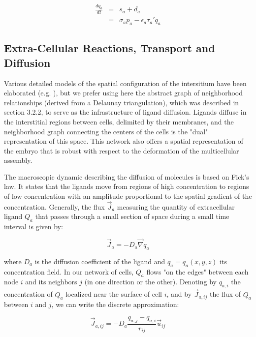 $$\begin{eqnarray}        \frac{dq_a}{dt} & = & s_a + d_a \\                        & = & \sigma_a p_a - \epsilon_a \tau_a' q_a      \end{eqnarray}$$


\subsection{Extra-Cellular Reactions, Transport and Diffusion}


Various detailed models of the spatial configuration of the intersitium have been elaborated (e.g. \cite{Kojic:2010jo}), but we prefer using here the abstract graph of neighborhood relationships (derived from a Delaunay triangulation), which was described in section 3.2.2, to serve as the infrastructure of ligand diffusion. Ligands diffuse in the interstitial regions between cells, delimited by their membranes, and the neighborhood graph connecting the centers of the cells is the "dual" representation of this space. This network also offers a spatial representation of the embryo that is robust with respect to the deformation of the multicellular assembly.

The macroscopic dynamic describing the diffusion of molecules is based on Fick's law. It states that the ligands move from regions of high concentration to regions of low concentration with an amplitude proportional to the spatial gradient of the concentration. Generally, the flux $\vec{J}_a$ measuring the quantity of extracellular ligand $Q_a$ that passes through a small section of space during a small time interval is given by:

$$\vec{J}_a = -D_a \vec{\nabla}q_a $$

where $D_a$ is the diffusion coefficient of the ligand and $q_a = q_a(x,y,z)$ its concentration field. In our network of cells, $Q_a$ flows "on the edges" between each node $i$ and its neighbors $j$ (in one direction or the other). Denoting by $q_{a,i}$ the concentration of $Q_a$ localized near the surface of cell $i$, and by $\vec{J}_{a,ij}$ the flux of $Q_a$ between $i$ and $j$, we can write the discrete approximation:

$$\vec{J}_{a,ij} = -D_a \frac{q_{a,j} - q_{a,i}}{r_{ij}}\vec{u}_{ij}$$

